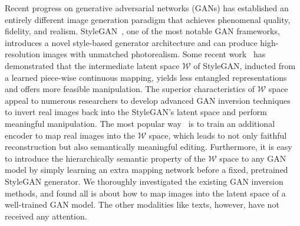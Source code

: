 \documentclass[final]{cvpr}
\newcommand{\W}{\mathcal{W}}
\begin{document}
Recent progress on generative adversarial networks (GANs) has established an entirely different image generation paradigm that achieves phenomenal quality, fidelity, and realism.
StyleGAN~\cite{karras2019style}, one of the most notable GAN frameworks, introduces a novel style-based generator architecture and can produce high-resolution images with unmatched photorealism.
Some recent work~\cite{karras2019style} has demonstrated that the intermediate latent space $\W$ of StyleGAN, inducted from a learned piece-wise continuous mapping, yields less entangled representations and offers more feasible manipulation.
The superior characteristics of $\W$ space appeal to numerous researchers to develop advanced GAN inversion techniques~\cite{xia2021survey,bau2019inverting,abdal2019image2stylegan} to invert real images back into the StyleGAN's latent space and perform meaningful manipulation.
The most popular way~\cite{zhu2020indomain,richardson2020encoding} is to train an additional encoder to map real images into the $\W$ space, which leads to not only faithful reconstruction but also semantically meaningful editing. 
Furthermore, it is easy to introduce the hierarchically semantic property of the $\W$ space to any GAN model by simply learning an extra mapping network before a fixed, pretrained StyleGAN generator.
We thoroughly investigated the existing GAN inversion methods, and found all is about how to map images into the latent space of a well-trained GAN model.
The other modalities like texts, however, have not received any attention.
\end{document}
